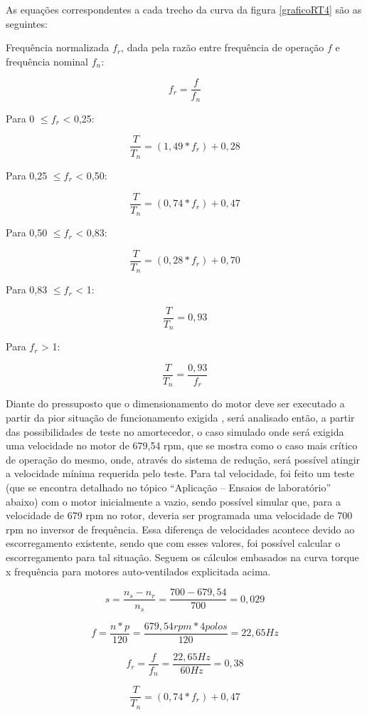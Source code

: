 	As equações correspondentes a cada trecho da curva da figura \ref{graficoRT4} são as seguintes:

	Frequência normalizada $f_{r}$, dada pela razão entre frequência de operação $f$ e frequência nominal $f_{n}$:

	$$ f_{r} = \frac{f}{f_{n}} $$

	Para 0 $\leq f_{r}$ < 0,25:

	$$ \frac{T}{T_{n}} = (1,49*f_{r}) + 0,28 $$

	Para 0,25 $\leq f_{r}$ < 0,50:

	$$ \frac{T}{T_{n}} = (0,74*f_{r}) + 0,47 $$

	Para 0,50 $\leq f_{r}$ < 0,83:

	$$ \frac{T}{T_{n}} = (0,28*f_{r}) + 0,70 $$

	Para 0,83 $\leq f_{r}$ < 1:

	$$ \frac{T}{T_{n}} = 0,93 $$

	Para $f_{r}$ > 1:
	
	$$ \frac{T}{T_{n}} = \frac{0,93}{f_{r}} $$


	Diante do pressuposto que o dimensionamento do motor deve ser executado a partir da pior situação de funcionamento exigida \cite{WEG03}, será analisado então, a partir das possibilidades de teste no amortecedor, o caso simulado onde será exigida uma velocidade no motor de 679,54 rpm, que se mostra como o caso mais crítico de operação do mesmo, onde, através do sistema de redução, será possível atingir a velocidade mínima requerida pelo teste. Para tal velocidade, foi feito um teste (que se encontra detalhado no tópico “Aplicação – Ensaios de laboratório” abaixo) com o motor inicialmente a vazio, sendo possível simular que, para a velocidade de 679 rpm no rotor, deveria ser programada uma velocidade de 700 rpm no inversor de frequência. Essa diferença de velocidades acontece devido ao escorregamento existente, sendo que com esses valores, foi possível calcular o escorregamento para tal situação. Seguem os cálculos embasados na curva torque x frequência para motores auto-ventilados explicitada acima.

	$$ s = \frac{n_{s} - n_{r}}{n_{s}} = \frac{700 - 679,54}{700} = 0,029 $$

	$$ f = \frac{n * p}{120} = \frac{679,54 rpm * 4 polos}{120} = 22,65 Hz $$

	$$ f_{r} = \frac{f}{f_{n}} = \frac{22,65 Hz}{60 Hz} = 0,38 $$

	$$ \frac{T}{T_{n}} = (0,74 * f_{r}) + 0,47 $$

